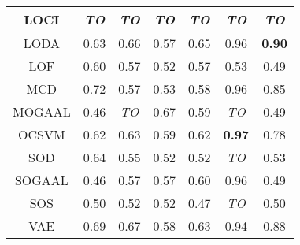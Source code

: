\begin{table*}[!t]
\begin{tabular}{|c|c|c|c|c|c|c|}
\hline
            LOCI &         \textit{TO} &    \textit{TO} &        \textit{TO} &        \textit{TO} &      \textit{TO} &      \textit{TO} \\
\hline
            LODA &                0.63 &           0.66 &               0.57 &               0.65 &             0.96 &    \textbf{0.90} \\
\hline
            LOF &                0.60 &           0.57 &               0.52 &               0.57 &             0.53 &             0.49 \\
\hline
            MCD &                0.72 &           0.57 &               0.53 &               0.58 &             0.96 &             0.85 \\
\hline
        MOGAAL &                0.46 &    \textit{TO} &               0.67 &               0.59 &      \textit{TO} &             0.49 \\
\hline
            OCSVM &                0.62 &           0.63 &               0.59 &               0.62 &    \textbf{0.97} &             0.78 \\
\hline
            SOD &                0.64 &           0.55 &               0.52 &               0.52 &      \textit{TO} &             0.53 \\
\hline
        SOGAAL &                0.46 &           0.57 &               0.57 &               0.60 &             0.96 &             0.49 \\
\hline
            SOS &                0.50 &           0.52 &               0.52 &               0.47 &      \textit{TO} &             0.50 \\
\hline
            VAE &                0.69 &           0.67 &               0.58 &               0.63 &             0.94 &             0.88 \\
\hline
\end{tabular}
\end{table*}


